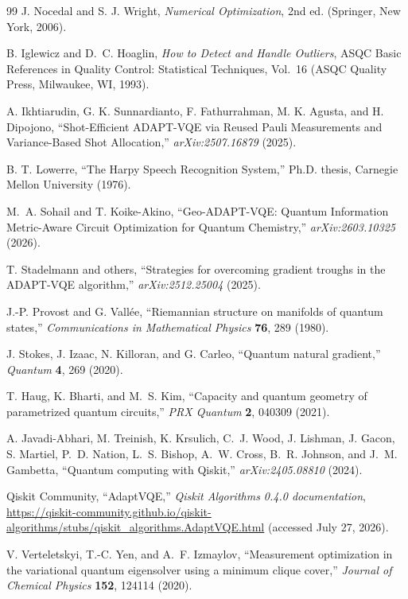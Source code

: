 \documentclass[
  reprint,
  amsmath,
  amssymb,
  aps,
  pra,
  nofootinbib,
  superscriptaddress,
  floatfix
]{revtex4-2}
\begin{document}
\begin{thebibliography}{99}
J. Nocedal and S. J. Wright,
\emph{Numerical Optimization}, 2nd ed.
(Springer, New York, 2006).

B. Iglewicz and D.~C. Hoaglin,
\emph{How to Detect and Handle Outliers},
ASQC Basic References in Quality Control: Statistical Techniques, Vol.~16
(ASQC Quality Press, Milwaukee, WI, 1993).

A. Ikhtiarudin, G. K. Sunnardianto, F. Fathurrahman, M. K. Agusta, and H. Dipojono,
``Shot-Efficient ADAPT-VQE via Reused Pauli Measurements and Variance-Based Shot Allocation,''
\emph{arXiv:2507.16879} (2025).

B. T. Lowerre,
``The Harpy Speech Recognition System,''
Ph.D. thesis, Carnegie Mellon University (1976).

M.~A. Sohail and T. Koike-Akino,
``Geo-ADAPT-VQE: Quantum Information Metric-Aware Circuit Optimization for Quantum Chemistry,''
\emph{arXiv:2603.10325} (2026).

T. Stadelmann and others,
``Strategies for overcoming gradient troughs in the ADAPT-VQE algorithm,''
\emph{arXiv:2512.25004} (2025).

J.-P. Provost and G. Vall\'ee,
``Riemannian structure on manifolds of quantum states,''
\emph{Communications in Mathematical Physics} \textbf{76}, 289 (1980).

J. Stokes, J. Izaac, N. Killoran, and G. Carleo,
``Quantum natural gradient,''
\emph{Quantum} \textbf{4}, 269 (2020).

T. Haug, K. Bharti, and M.~S. Kim,
``Capacity and quantum geometry of parametrized quantum circuits,''
\emph{PRX Quantum} \textbf{2}, 040309 (2021).

A. Javadi-Abhari, M. Treinish, K. Krsulich, C.~J. Wood, J. Lishman, J. Gacon, S. Martiel, P.~D. Nation, L.~S. Bishop, A.~W. Cross, B.~R. Johnson, and J.~M. Gambetta,
``Quantum computing with Qiskit,''
\emph{arXiv:2405.08810} (2024).

Qiskit Community,
``AdaptVQE,''
\emph{Qiskit Algorithms 0.4.0 documentation},
\url{https://qiskit-community.github.io/qiskit-algorithms/stubs/qiskit_algorithms.AdaptVQE.html}
(accessed July 27, 2026).

V. Verteletskyi, T.-C. Yen, and A.~F. Izmaylov,
``Measurement optimization in the variational quantum eigensolver using a minimum clique cover,''
\emph{Journal of Chemical Physics} \textbf{152}, 124114 (2020).


\end{thebibliography}
\end{document}
